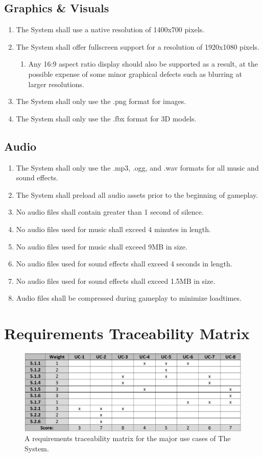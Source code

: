 \documentclass[12pt]{report}
\newenvironment{reqlist}{
	\renewcommand{\labelenumi}{\tab\thesubsection.\arabic{enumi}}
	\renewcommand{\labelenumii}{\thesubsection.\arabic{enumi}.\arabic{enumii}}
	\begin{enumerate}[itemsep = 1pt, parsep = 0pt, leftmargin = *]
}{\end{enumerate}}
\begin{document}
	\subsection{Graphics \& Visuals}
		\begin{reqlist}
			\item The System shall use a native resolution of 1400x700 pixels.
			\item The System shall offer fullscreen support for a resolution of 1920x1080 pixels.
			\begin{reqlist}
				\item Any 16:9 aspect ratio display should also be supported as a result, at the possible expense of some minor graphical defects such as blurring at larger resolutions.
			\end{reqlist}
			\item The System shall only use the .png format for images.
			\item The System shall only use the .fbx format for 3D models.
		\end{reqlist}
	\subsection{Audio}
		\begin{reqlist}
			\item The System shall only use the .mp3, .ogg, and .wav formats for all music and sound effects.
			\item The System shall preload all audio assets prior to the beginning of gameplay.
			\item No audio files shall contain greater than 1 second of silence.
			\item No audio files used for music shall exceed 4 minutes in length.
			\item No audio files used for music shall exceed 9MB in size.
			\item No audio files used for sound effects shall exceed 4 seconds in length.
			\item No audio files used for sound effects shall exceed 1.5MB in size.
			\item Audio files shall be compressed during gameplay to minimize loadtimes.
		\end{reqlist}

\newpage
\section{Requirements Traceability Matrix}
	\begin{figure}[!htb]
		\centering
		\includegraphics[scale=0.35]{images/Matrix.png}
		\caption{A requirements traceability matrix for the major use cases of The System.}
	\end{figure}
\listoffigures
\end{document}
